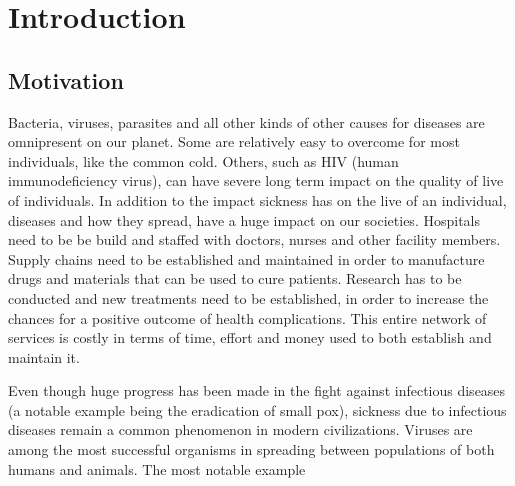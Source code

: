 
\chapter{Introduction} %

\label{chap:introduction} %


\section{Motivation}
Bacteria, viruses, parasites and all other kinds of other causes for diseases are omnipresent on our planet\cite{??}. Some are
relatively easy to overcome for most individuals, like the common cold\cite{??}. Others, such as HIV (human immunodeficiency virus),
can have severe long term impact on the quality of live of individuals\cite{??}. In addition to the impact sickness has
on the live of an individual, diseases and how they spread, have a huge impact on our societies. Hospitals need to be 
be build and staffed with doctors, nurses and other facility members. Supply chains need to be established and maintained in order
to manufacture drugs and materials that can be used to cure patients. Research has to be conducted and new treatments need to be
established, in order to increase the chances for a positive outcome of health complications. This entire network of services is
costly in terms of time, effort  and money used to both establish and maintain it.
\par
Even though huge progress has been made in the fight against infectious diseases (a notable example being the eradication of
small pox\cite{??}), sickness due to infectious diseases remain a common phenomenon in modern civilizations. Viruses are
among the most successful organisms in spreading between populations of both humans and animals\cite{??}. The most notable example
